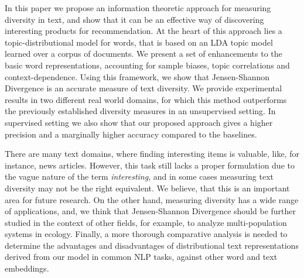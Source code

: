 In this paper we propose an information theoretic approach for
measuring diversity in text, and show that it can be an effective way
of discovering interesting products for recommendation. At the heart
of this approach lies a 
topic-distributional model for words, that is based on an LDA topic
model learned over a corpus of documents. We present a set of
enhancements to the 
basic word representations, accounting for sample
biases, topic correlations and context-dependence. Using this framework,
we show that Jensen-Shannon Divergence is an accurate measure of text
diversity. We provide experimental results in two different real 
world domains, for which this method outperforms the previously
established diversity measures in an unsupervised setting. In
supervised setting we also show that our proposed approach gives a
higher precision and a marginally higher accuracy compared to the
baselines.

There are many text domains, where finding interesting items is valuable, 
like, for instance, news articles. However, this task still lacks a
proper formulation due to the vague nature of the term {\em
interesting}, and in some cases measuring text diversity may not be
the right equivalent. We believe, that this is an important area for
future research. On the other hand, measuring diversity has a
wide range of applications, and, we think that Jensen-Shannon 
Divergence should be further studied in the context of other
fields, for example, to analyze multi-population systems in
ecology. Finally, a more thorough comparative analysis  
is needed to determine the advantages and disadvantages of
distributional text representations derived from our model in common
NLP tasks, against other word and text embeddings.

 